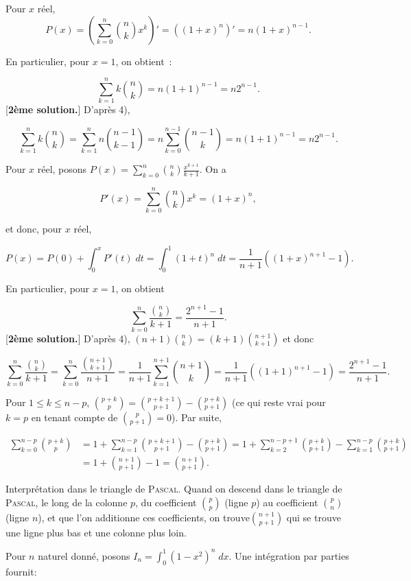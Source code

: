 {\begin{enumerate}
{\begin{itemize}
Pour $x$ réel, $$P(x)=(\sum_{k=0}^{n}\binom{n}{k}x^{k})'=((1+x)^n)'=n(1+x)^{n-1}.$$

En particulier, pour $x=1$, on obtient~:

$$\sum_{k=1}^{n}k\binom{n}{k}=n(1+1)^{n-1}=n2^{n-1}.$$
[\textbf{2ème solution.}] D'après 4),

$$\sum_{k=1}^{n}k\binom{n}{k}=\sum_{k=1}^{n}n\binom{n-1}{k-1}=n\sum_{k=0}^{n-1}\binom{n-1}{k}=n(1+1)^{n-1}=n2^{n-1}.$$
\end{itemize}

\begin{itemize}
 Pour $x$ réel, posons $P(x)=\sum_{k=0}^{n}\binom{n}{k}\frac{x^{k+1}}{k+1}$. On a

$$P'(x)=\sum_{k=0}^{n}\binom{n}{k}x^k=(1+x)^n,$$

et donc, pour $x$ réel,

$$P(x)=P(0)+\int_{0}^{x}P'(t)\;dt=\int_{0}^{1}(1+t)^n\;dt=\frac{1}{n+1}((1+x)^{n+1}-1).$$

En particulier, pour $x=1$, on obtient

$$\sum_{k=0}^{n}\frac{\binom{n}{k}}{k+1}=\frac{2^{n+1}-1}{n+1}.$$
[\textbf{2ème solution.}] D'après 4), $(n+1)\binom{n}{k}=(k+1)\binom{n+1}{k+1}$ et donc

$$\sum_{k=0}^{n}\frac{\binom{n}{k}}{k+1}=\sum_{k=0}^{n}\frac{\binom{n+1}{k+1}}{n+1}=\frac{1}{n+1}\sum_{k=1}^{n+1}\binom{n+1}{k}
=\frac{1}{n+1}((1+1)^{n+1}-1)=\frac{2^{n+1}-1}{n+1}.$$
\end{itemize}
Pour $1\leq k\leq n-p$, $\binom{p+k}{p}=\binom{p+k+1}{p+1}-\binom{p+k}{p+1}$ (ce qui reste vrai pour $k=p$ en tenant
compte de $\binom{p}{p+1}=0$). Par suite,

\begin{align*}
\sum_{k=0}^{n-p}\binom{p+k}{p}&=1+\sum_{k=1}^{n-p}\binom{p+k+1}{p+1}-\binom{p+k}{p+1}=1+\sum_{k=2}^{n-p+1}\binom{p+k}{p+1}
-\sum_{k=1}^{n-p}\binom{p+k}{p+1}\\
 &=1+\binom{n+1}{p+1}-1=\binom{n+1}{p+1}.
\end{align*}

Interprétation dans le triangle de \textsc{Pascal}. Quand on descend dans le triangle de \textsc{Pascal}, le long de la
colonne $p$, du coefficient $\binom{p}{p}$ (ligne $p$) au coefficient $\binom{p}{n}$ (ligne $n$), et que l'on additionne ces
coefficients, on trouve$\binom{n+1}{p+1}$ qui se trouve une ligne plus bas et une colonne plus loin.
\begin{enumerate}
Pour $n$ naturel donné, posons $I_n=\int_{0}^{1}(1-x^2)^n\;dx$. Une intégration par parties fournit:


\end{enumerate}}
\end{enumerate}}
